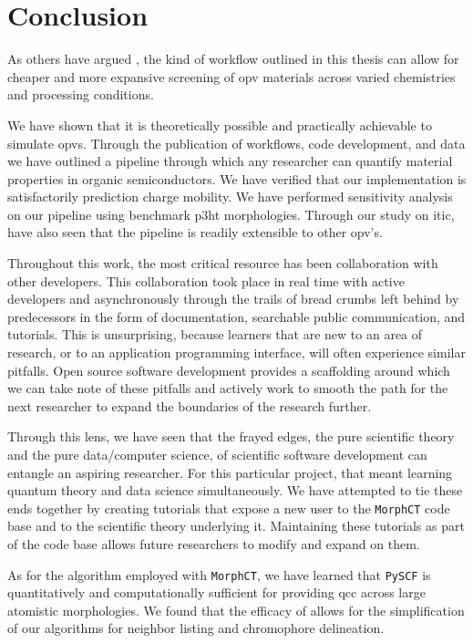 \chapter{Conclusion}
\label{conclusion}

As others have argued \cite{Evans2016}\cite{Gali2017}\cite{Jones2017}, the kind of workflow outlined in this thesis
can allow for cheaper and more expansive screening of \gls{opv} materials across varied chemistries and processing
conditions. 

We have shown that it is theoretically possible and practically
achievable to simulate \gls{opv}s. 
Through the publication
of workflows, code development, and data we have outlined a 
pipeline through which any researcher can quantify material properties in
organic semiconductors. We have verified that our implementation is satisfactorily prediction charge mobility. We have performed sensitivity analysis on our pipeline using benchmark
\gls{p3ht} morphologies. Through our study on \gls{itic},  have also seen that the pipeline is readily
extensible to other \gls{opv}'s.

Throughout this work, the most critical resource has been collaboration with
other developers. This collaboration took place in real time with active
developers and asynchronously through the trails of bread crumbs left behind
by predecessors in the form of documentation, searchable public communication,
and tutorials. This is unsurprising, because learners that are new to an area
of research, or to an application programming interface, will often experience
similar pitfalls. Open source software development provides a scaffolding
around which we can take note of these pitfalls and actively work to smooth the 
path for the next
researcher to expand the boundaries of the research further.

Through this lens, we have seen that the frayed edges, the pure
scientific theory and the pure data/computer science, of scientific software
development can entangle an aspiring researcher. For this particular project,
that meant learning quantum theory and data science simultaneously. We have
attempted to tie these ends together by creating tutorials that expose a new
user to the \texttt{MorphCT} code base and to the scientific theory
underlying it. Maintaining these tutorials as part of the code base allows
future researchers to modify and expand on them. 

As for the algorithm employed with \texttt{MorphCT}, we have learned that
\texttt{PySCF} is quantitatively and computationally sufficient for providing
\gls{qcc} across large atomistic morphologies. We found that the efficacy of
 allows for the simplification of our algorithms for neighbor
listing and chromophore delineation.  

